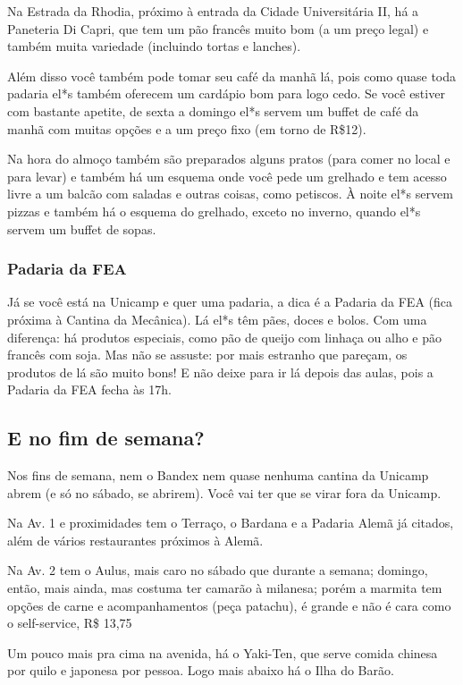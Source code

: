 Na Estrada da Rhodia, próximo à entrada da Cidade Universitária II, há a
Paneteria Di Capri, que tem um pão francês muito bom (a um preço legal) e também
muita variedade (incluindo tortas e lanches).

Além disso você também pode tomar seu café da manhã lá, pois como quase toda
padaria el*s também oferecem um cardápio bom para logo cedo. Se você estiver com
bastante apetite, de sexta a domingo el*s servem um buffet de café da manhã com
muitas opções e a um preço fixo (em torno de R\$12).

Na hora do almoço também são preparados alguns pratos (para comer no local e
para levar) e também há um esquema onde você pede um grelhado e tem acesso livre
a um balcão com saladas e outras coisas, como petiscos. À noite el*s servem
pizzas e também há o esquema do grelhado, exceto no inverno, quando el*s servem
um buffet de sopas.

\subsubsection{Padaria da FEA}

Já se você está na Unicamp e quer uma padaria, a dica é a Padaria da FEA (fica
próxima à Cantina da Mecânica). Lá el*s têm pães, doces e bolos. Com uma
diferença: há produtos especiais, como pão de queijo com linhaça ou alho e pão
francês com soja. Mas não se assuste: por mais estranho que pareçam, os produtos
de lá são muito bons! E não deixe para ir lá depois das aulas, pois a Padaria da
FEA fecha às 17h.

\subsection{E no fim de semana?}

Nos fins de semana, nem o Bandex nem quase nenhuma cantina da Unicamp abrem (e
só no sábado, se abrirem). Você vai ter que se virar fora da Unicamp.

Na Av. 1 e proximidades tem o Terraço, o Bardana e a Padaria Alemã já citados,
além de vários restaurantes próximos à Alemã.

Na Av. 2 tem o Aulus, mais caro no sábado que durante a semana; domingo, então,
mais ainda, mas costuma ter camarão à milanesa; porém a marmita tem opções de
carne e acompanhamentos (peça patachu), é grande e não é cara como o
self-service, R\$ 13,75

Um pouco mais pra cima na avenida, há o Yaki-Ten, que serve comida chinesa por
quilo e japonesa por pessoa.  Logo mais abaixo há o Ilha do Barão.

